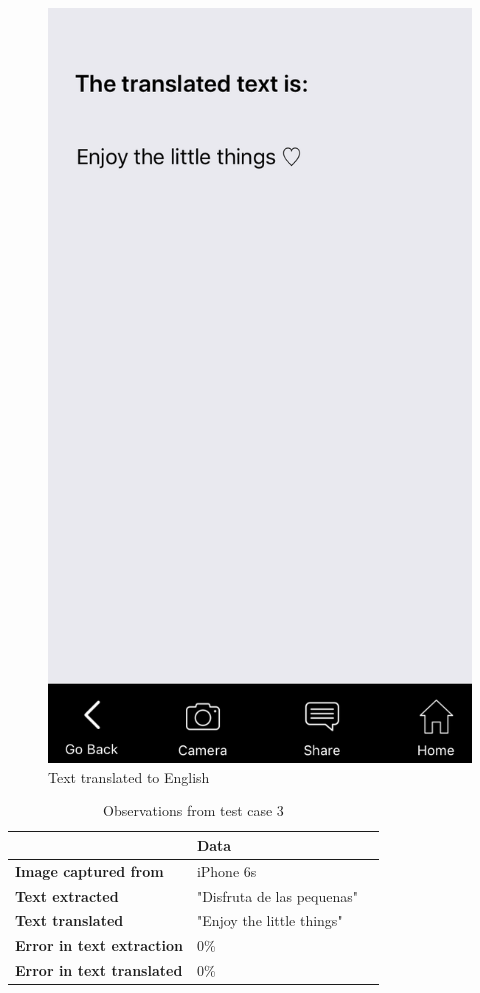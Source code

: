 \documentclass[12pt]{article}
\begin{document}
       \begin{figure}[H]
	\centering
	\includegraphics[width=0.5\linewidth]{media/case3-eng.PNG}
	\caption{Text translated to English}
	\label{fig:eng}
\end{figure} 


\begin{table}%
    \centering
   
    \label{my-label3}
       \begin{tabular}{|p{30mm}|p{55mm}|p{35mm}|}
 \hline
  & \textbf{Data}  \\ [0.5ex] 
 \hline\hline
 \textbf{Image captured from} & iPhone 6s  \\
 \hline
  \textbf{Text extracted} & "Disfruta de las pequenas" \\
 \hline
 \textbf{Text translated} & "Enjoy the little things"   \\
 \hline
 \textbf{Error in text extraction} & 0\%   \\
 \hline
 \textbf{Error in text translated} & 0\%   \\ [1ex] 
 \hline
    \end{tabular}
     \caption{Observations from test case 3} 
\end{table}
\end{document}
